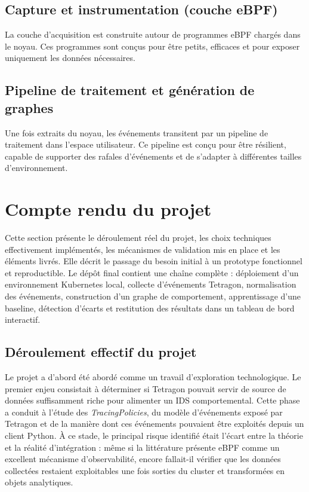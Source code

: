 \documentclass[a4paper,12pt]{article}
\begin{document}
\subsection{Capture et instrumentation (couche eBPF)}

La couche d'acquisition est construite autour de programmes eBPF chargés dans le noyau. Ces programmes sont conçus pour être petits, efficaces et pour exposer uniquement les données nécessaires.

\subsection{Pipeline de traitement et génération de graphes}

Une fois extraits du noyau, les événements transitent par un pipeline de traitement dans l'espace utilisateur. Ce pipeline est conçu pour être résilient, capable de supporter des rafales d'événements et de s'adapter à différentes tailles d'environnement.


\section{Compte rendu du projet}

Cette section présente le déroulement réel du projet, les choix techniques effectivement implémentés, les mécanismes de validation mis en place et les éléments livrés. Elle décrit le passage du besoin initial à un prototype fonctionnel et reproductible. Le dépôt final contient une chaîne complète : déploiement d'un environnement Kubernetes local, collecte d'événements Tetragon, normalisation des événements, construction d'un graphe de comportement, apprentissage d'une baseline, détection d'écarts et restitution des résultats dans un tableau de bord interactif.

\subsection{Déroulement effectif du projet}

Le projet a d'abord été abordé comme un travail d'exploration technologique. Le premier enjeu consistait à déterminer si Tetragon pouvait servir de source de données suffisamment riche pour alimenter un IDS comportemental. Cette phase a conduit à l'étude des \textit{TracingPolicies}, du modèle d'événements exposé par Tetragon et de la manière dont ces événements pouvaient être exploités depuis un client Python. À ce stade, le principal risque identifié était l'écart entre la théorie et la réalité d'intégration : même si la littérature présente eBPF comme un excellent mécanisme d'observabilité, encore fallait-il vérifier que les données collectées restaient exploitables une fois sorties du cluster et transformées en objets analytiques.
\end{document}
